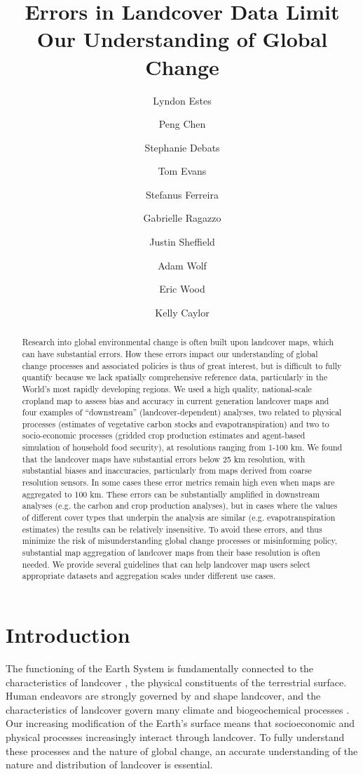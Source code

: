 \documentclass[a4paper]{article}
\title{Errors in Landcover Data Limit Our Understanding of Global Change}
\author[1,2]{Lyndon Estes}
\author[3]{Peng Chen}
\author[1]{Stephanie Debats}
\author[3]{Tom Evans}
\author[4]{Stefanus Ferreira}
\author[5]{Gabrielle Ragazzo}
\author[1]{Justin Sheffield}
\author[5]{Adam Wolf}
\author[1]{Eric Wood}
\author[1]{Kelly Caylor}
\affil[2]{Woodrow Wilson School, Princeton University, Princeton, NJ USA}
\affil[1]{Civil and Environmental Engineering, Princeton University, Princeton, NJ USA}
\affil[3]{Indiana University, Bloomington, IN USA}
\affil[4]{GeoTerraImage, Pretoria, RSA}
\affil[5]{Ecology and Evolutionary Biology, Princeton University, Princeton, NJ USA}
\date{}
\begin{document}
\maketitle 

\begin{abstract}
{Research into global environmental change is often built upon landcover maps, which can have substantial errors. How these errors impact our understanding of global change processes and associated policies is thus of great interest, but is difficult to fully quantify because we lack spatially comprehensive reference data, particularly in the World's most rapidly developing regions. We used a high quality, national-scale cropland map to assess bias and accuracy in current generation landcover maps and four examples of ``downstream'' (landcover-dependent) analyses, two related to physical processes (estimates of vegetative carbon stocks and evapotranspiration) and two to socio-economic processes (gridded crop production estimates and agent-based simulation of household food security), at resolutions ranging from 1-100 km. We found that the landcover maps have substantial errors below 25 km resolution, with substantial biases and inaccuracies, particularly from maps derived from coarse resolution sensors. In some cases these error metrics remain high even when maps are aggregated to 100 km. These errors can be substantially amplified in downstream analyses (e.g. the carbon and crop production analyses), but in cases where the values of different cover types that underpin the analysis are similar (e.g. evapotranspiration estimates) the results can be relatively insensitive. To avoid these errors, and thus minimize the risk of misunderstanding global change processes or misinforming policy, substantial map aggregation of landcover maps from their base resolution is often needed. We provide several guidelines that can help landcover map users select appropriate datasets and  aggregation scales under different use cases. 
}
\end{abstract}


\linenumbers

\section*{Introduction}
The functioning of the Earth System is fundamentally connected to the characteristics of landcover \citep{lambin_modelling_1997}, the physical constituents of the terrestrial surface. Human endeavors are strongly governed by and shape landcover, and the characteristics of landcover govern many climate and biogeochemical processes \citep{lambin_dynamics_2003}. Our increasing modification of the Earth's surface \citep{lambin_dynamics_2003} means that socioeconomic and physical processes increasingly interact through landcover. To fully understand these processes and the nature of global change, an accurate understanding of the nature and distribution of landcover is essential.  
\end{document}
